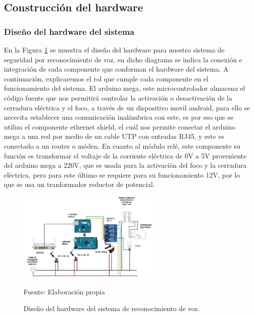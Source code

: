 \newpage
\subsection{Construcción del hardware}
\subsubsection{Diseño del hardware del sistema}
En la Figura \ref{fig:figura3.69} se muestra el diseño del hardware para nuestro sistema de seguridad por reconocimiento de voz, en dicho diagrama se indica la conexión e integración de cada componente que conforman el hardware del sistema.
\vskip 0.5cm
A continuación, explicaremos el rol que cumple cada componente en el funcionamiento del sistema. El arduino mega, este microcontrolador almacena el código fuente que nos permitirá controlar la activación o desactivación de la cerradura eléctrica y el foco, a través de un dispositivo movil android, para ello se nececita establecer una comunicación inalámbrica con este, es por eso que se utiliza el componente ethernet shield, el cuál nos permite conectar el arduino mega a una red por medio de un cable UTP con entradas RJ45, y este es conectado a un router o móden.
\vskip 0.5cm
En cuanto al módulo relé, este componente su función es transformar el voltaje de la corriente eléctrica de 0V a 5V proveniente del arduino mega a 220V, que es usada para la activación del foco y la cerradura eléctrica, pero para este último se requiere para su funcionamiento 12V, por lo que se usa un tranformador reductor de potencial.
\begin{figure}[H]
\captionsetup{justification=centering}
\begin{center}
\includegraphics[width=0.62\textwidth]{Imagenes/Cap3/image069}
\end{center}
\begin{center}
\vskip -0.5cm
\caption{\small{Diseño del hardware del sistema de reconocimiento de voz.}}
\label{fig:figura3.69}
{\small{Fuente: Elaboración propia}}
\end{center}
\end{figure}

